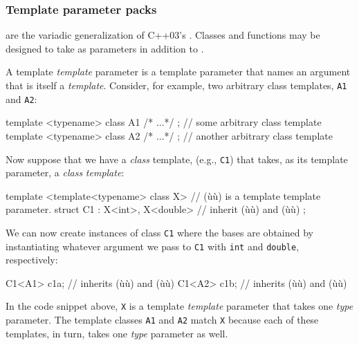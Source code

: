 \subsubsection[Template parameter packs]{Template parameter packs}\label{template-parameter-packs}

 are the variadic generalization of
C++03's . Classes and functions may
be designed to take  as parameters in
addition to .

A template \emph{template} parameter is a template parameter that names
an argument that is itself a \emph{template}. Consider, for example, two
arbitrary class templates, \lstinline!A1! and \lstinline!A2!:

\begin{emcppslisting}[emcppsbatch=e24]
template <typename> class A1 {/* ...*/ };  // some arbitrary class template
template <typename> class A2 {/* ...*/ };  // another arbitrary class template
\end{emcppslisting}
    

\noindent Now suppose that we have a \emph{class} template, (e.g., \lstinline!C1!)
that takes, as its template parameter, a \emph{class} \emph{template}:

\begin{emcppslisting}[emcppsbatch=e24]
template <template<typename> class X>  // (ù{}ù) is a template template parameter.
struct C1 : X<int>, X<double>          // inherit (ù{}ù) and (ù{}ù)
{ };
\end{emcppslisting}
    

\noindent We can now create instances of class \lstinline!C1! where the bases are
obtained by instantiating whatever argument we pass to \lstinline!C1! with
\lstinline!int! and \lstinline!double!, respectively:

\begin{emcppslisting}[emcppsbatch=e24]
C1<A1> c1a;  // inherits (ù{}ù) and (ù{}ù)
C1<A2> c1b;  // inherits (ù{}ù) and (ù{}ù)
\end{emcppslisting}
    

\noindent In the code snippet above, \lstinline!X! is a template \emph{template}
parameter that takes one \emph{type} parameter. The template classes
\lstinline!A1! and \lstinline!A2! match \lstinline!X! because each of these
templates, in turn, takes one \emph{type} parameter as well.

